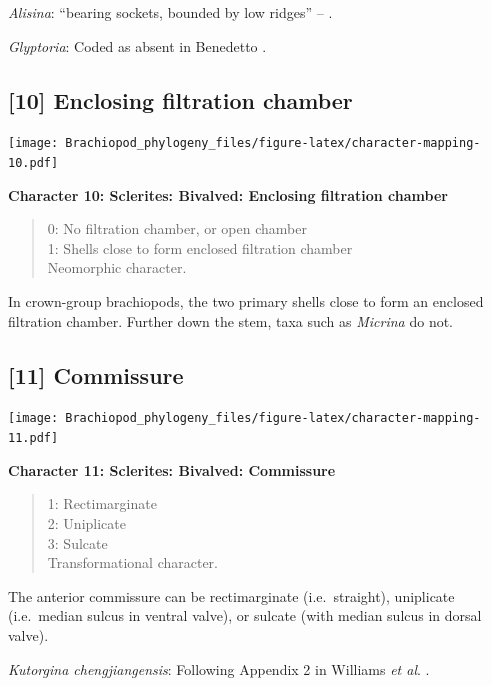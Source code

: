 \documentclass[]{book}
\theoremstyle{definition}
\theoremstyle{definition}
\theoremstyle{definition}
\theoremstyle{remark}
\begin{document}
\emph{Alisina}: ``bearing sockets, bounded by low ridges'' --
\citet{Williams2000BrachiopodaLinguliformea}.

\emph{Glyptoria}: Coded as absent in Benedetto
\citeyearpar{Benedetto2009iChaniella}.

\hypertarget{enclosing-filtration-chamber}{%
\subsection*{{[}10{]} Enclosing filtration
chamber}\label{enclosing-filtration-chamber}}

\texttt{[image: Brachiopod\_phylogeny\_files/figure-latex/character-mapping-10.pdf]}

\textbf{Character 10: Sclerites: Bivalved: Enclosing filtration chamber}

\begin{quote}
0: No filtration chamber, or open chamber\\
1: Shells close to form enclosed filtration chamber\\
Neomorphic character.
\end{quote}

In crown-group brachiopods, the two primary shells close to form an
enclosed filtration chamber. Further down the stem, taxa such as
\emph{Micrina} do not.

\hypertarget{commissure}{%
\subsection*{{[}11{]} Commissure}\label{commissure}}

\texttt{[image: Brachiopod\_phylogeny\_files/figure-latex/character-mapping-11.pdf]}

\textbf{Character 11: Sclerites: Bivalved: Commissure}

\begin{quote}
1: Rectimarginate\\
2: Uniplicate\\
3: Sulcate\\
Transformational character.
\end{quote}

The anterior commissure can be rectimarginate (i.e.~straight),
uniplicate (i.e.~median sulcus in ventral valve), or sulcate (with
median sulcus in dorsal valve).

\emph{Kutorgina chengjiangensis}: Following Appendix 2 in Williams
\emph{et al}. \citeyearpar{Williams1998Thediversity}.
\end{document}
